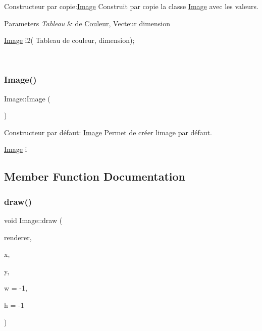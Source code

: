 Constructeur par copie\+:\hyperlink{classImage}{Image} Construit par copie la classe \hyperlink{classImage}{Image} avec les valeurs. 


\begin{DoxyParams}{Parameters}
{\em Tableau} & de \hyperlink{classCouleur}{Couleur}, Vecteur dimension 
\begin{DoxyCode}
\hyperlink{classImage}{Image} i2( Tableau de couleur, dimension);
\end{DoxyCode}
 \\
\hline
\end{DoxyParams}
\mbox{\label{classImage_a58edd1c45b4faeb5f789b0d036d02313}} 
\subsubsection{\texorpdfstring{Image()}{Image()}\hspace{0.1cm}{\footnotesize\ttfamily [4/4]}}
{\footnotesize\ttfamily Image\+::\+Image (\begin{DoxyParamCaption}{ }\end{DoxyParamCaption})}



Constructeur par défaut\+: \hyperlink{classImage}{Image} Permet de créer l\textquotesingle{}image par défaut. 


\begin{DoxyCode}
\hyperlink{classImage}{Image} i
\end{DoxyCode}
 

\subsection{Member Function Documentation}
\mbox{\label{classImage_a82d6936d466ba0161d8b9cbacf613de5}} 
\subsubsection{\texorpdfstring{draw()}{draw()}}
{\footnotesize\ttfamily void Image\+::draw (\begin{DoxyParamCaption}\item[{S\+D\+L\+\_\+\+Renderer $\ast$}]{renderer,  }\item[{int}]{x,  }\item[{int}]{y,  }\item[{int}]{w = {\ttfamily -\/1},  }\item[{int}]{h = {\ttfamily -\/1} }\end{DoxyParamCaption})}




